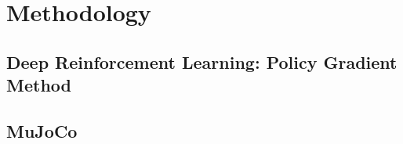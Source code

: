 \section{Methodology}

\subsection{Deep Reinforcement Learning: Policy Gradient Method}

\subsection{MuJoCo}
